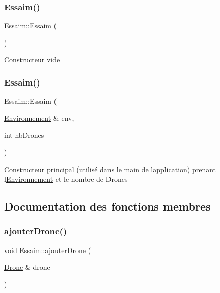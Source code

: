 \subsubsection{\texorpdfstring{Essaim()}{Essaim()}\hspace{0.1cm}{\footnotesize\ttfamily [1/2]}}
{\footnotesize\ttfamily Essaim\+::\+Essaim (\begin{DoxyParamCaption}{ }\end{DoxyParamCaption})}

Constructeur vide \mbox{\label{class_essaim_a1b2112a27d547ae2e19d75166b396886}} 
\subsubsection{\texorpdfstring{Essaim()}{Essaim()}\hspace{0.1cm}{\footnotesize\ttfamily [2/2]}}
{\footnotesize\ttfamily Essaim\+::\+Essaim (\begin{DoxyParamCaption}\item[{\mbox{\hyperlink{class_environnement}{Environnement}} \&}]{env,  }\item[{int}]{nb\+Drones }\end{DoxyParamCaption})}

Constructeur principal (utilisé dans le main de l\textquotesingle{}application) prenant l\textquotesingle{}\mbox{\hyperlink{class_environnement}{Environnement}} et le nombre de Drones 

\subsection{Documentation des fonctions membres}
\mbox{\label{class_essaim_a267e5067cbc6f33f3fa2b7e4e4a742a9}} 
\subsubsection{\texorpdfstring{ajouter\+Drone()}{ajouterDrone()}}
{\footnotesize\ttfamily void Essaim\+::ajouter\+Drone (\begin{DoxyParamCaption}\item[{\mbox{\hyperlink{class_drone}{Drone}} \&}]{drone }\end{DoxyParamCaption})}

